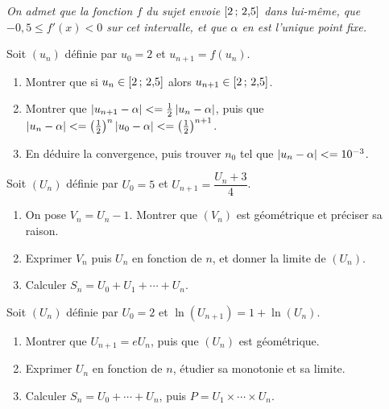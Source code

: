 \begin{annales}
\emph{On admet que la fonction $f$ du sujet envoie $\left[2\,;\,2{,}5\right]$
dans lui-même, que $-0{,}5 \leq f'(x) < 0$ sur cet intervalle, et que $\alpha$
en est l'unique point fixe.}

Soit $(u_{n})$ définie par $u_{0} = 2$ et $u_{n+1} = f(u_{n})$.
\begin{enumerate}[label=\textbf{\alph*)}, leftmargin=*, itemsep=0.15em]
  \item Montrer que si $u_{n} \in \left[2\,;\,2{,}5\right]$ alors
        $u_{n+1} \in \left[2\,;\,2{,}5\right]$.
  \item Montrer que $\left|u_{n+1}-\alpha\right| <= \frac12\left|u_{n}-\alpha\right|$,
        puis que $\left|u_{n}-\alpha\right| <=
        \left(\frac12\right)^{n}\left|u_{0}-\alpha\right| <=
        \left(\frac12\right)^{n+1}$.
  \item En déduire la convergence, puis trouver $n_{0}$ tel que
        $\left|u_{n}-\alpha\right| <= 10^{-3}$.
\end{enumerate}

Soit $(U_{n})$ définie par $U_{0} = 5$ et
$U_{n+1} = \dfrac{U_{n}+3}{4}$.
\begin{enumerate}[label=\textbf{\alph*)}, leftmargin=*, itemsep=0.15em]
  \item On pose $V_{n} = U_{n}-1$. Montrer que $(V_{n})$ est géométrique et
        préciser sa raison.
  \item Exprimer $V_{n}$ puis $U_{n}$ en fonction de $n$, et donner la limite
        de $(U_{n})$.
  \item Calculer $S_{n} = U_{0}+U_{1}+\cdots+U_{n}$.
\end{enumerate}

Soit $(U_{n})$ définie par $U_{0} = 2$ et
$\ln\!\left(U_{n+1}\right) = 1+\ln\!\left(U_{n}\right)$.
\begin{enumerate}[label=\textbf{\alph*)}, leftmargin=*, itemsep=0.15em]
  \item Montrer que $U_{n+1} = eU_{n}$, puis que $(U_{n})$ est géométrique.
  \item Exprimer $U_{n}$ en fonction de $n$, étudier sa monotonie et sa
        limite.
  \item Calculer $S_{n} = U_{0}+\cdots+U_{n}$, puis
        $P = U_{1}\times\cdots\times U_{n}$.
\end{enumerate}


\end{annales}
